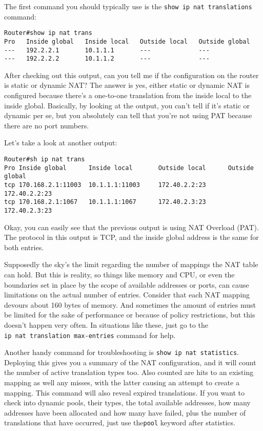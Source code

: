The first command you should typically use is the
\texttt{show\ ip\ nat\ translations} command:

\begin{verbatim}
Router#show ip nat trans
Pro   Inside global   Inside local   Outside local   Outside global
---   192.2.2.1       10.1.1.1       ---             ---
---   192.2.2.2       10.1.1.2       ---             ---
\end{verbatim}

After checking out this output, can you tell me if the configuration on
the router is static or dynamic NAT? The answer is yes, either static or
dynamic NAT is configured because there's a one-to-one translation from
the inside local to the inside global. Basically, by looking at the
output, you can't tell if it's static or dynamic per se, but you
absolutely can tell that you're not using PAT because there are no port
numbers.

Let's take a look at another output:

\begin{verbatim}
Router#sh ip nat trans
Pro Inside global      Inside local       Outside local      Outside global
tcp 170.168.2.1:11003  10.1.1.1:11003     172.40.2.2:23      172.40.2.2:23
tcp 170.168.2.1:1067   10.1.1.1:1067      172.40.2.3:23      172.40.2.3:23
\end{verbatim}

Okay, you can easily see that the previous output is using NAT Overload
(PAT). The protocol in this output is TCP, and the inside global address
is the same for both entries.

Supposedly the sky's the limit regarding the number of mappings the NAT
table can hold. But this is reality, so things like memory and CPU, or
even the boundaries set in place by the scope of available addresses or
ports, can cause limitations on the actual number of entries. Consider
that each NAT mapping devours about 160 bytes of memory. And sometimes
the amount of entries must be limited for the sake of performance or
because of policy restrictions, but this doesn't happen very often. In
situations like these, just go to the
\texttt{ip\ nat\ translation\ max-entries} command for help.

Another handy command for troubleshooting is
\texttt{show\ ip\ nat\ statistics}. Deploying this gives you a summary
of the NAT configuration, and it will count the number of active
translation types too. Also counted are hits to an existing mapping as
well any misses, with the latter causing an attempt to create a mapping.
This command will also reveal expired translations. If you want to check
into dynamic pools, their types, the total available addresses, how many
addresses have been allocated and how many have failed, plus the number
of translations that have occurred, just use the\texttt{pool} keyword
after statistics.

